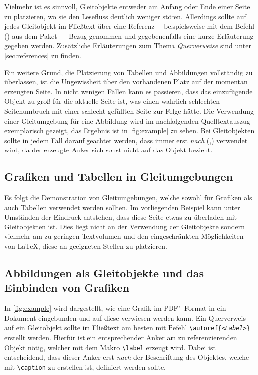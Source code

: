 \documentclass[%
  english,ngerman,%
  cdgeometry=no,DIV=12,%
  automark,%
  listof=toc,%
]{tudscrartcl}
\begin{document}
Vielmehr ist es sinnvoll, Gleitobjekte entweder am Anfang oder Ende einer Seite 
zu platzieren, wo sie den Lesefluss deutlich weniger stören. Allerdings sollte 
auf jedes Gleitobjekt im Fließtext über eine Referenz~-- beispielsweise mit dem 
Befehl () aus dem Paket ~-- 
Bezug genommen und gegebenenfalls eine kurze Erläuterung gegeben werden. 
Zusätzliche Erläuterungen zum Thema \emph{Querverweise} sind unter 
\autoref{sec:references} zu finden.

Ein weitere Grund,  die Platzierung von Tabellen und Abbildungen 
vollständig zu überlassen, ist die Ungewissheit über den vorhandenen Platz auf 
der momentan erzeugten Seite. In nicht wenigen Fällen kann es passieren, dass 
das einzufügende Objekt zu groß für die aktuelle Seite ist, was einen wahrlich 
schlechten Seitenumbruch mit einer schlecht gefüllten Seite zur Folge hätte.
Die Verwendung einer Gleitumgebung für eine Abbildung wird im nachfolgenden 
Quelltextauszug exemplarisch gezeigt, das Ergebnis ist in \autoref{fig:example} 
zu sehen. Bei Gleitobjekten sollte in jedem Fall darauf geachtet werden, dass 
 immer erst \emph{nach} 
(,) verwendet wird, da 
der erzeugte Anker sich sonst nicht auf das Objekt bezieht.
%
\begin{Trunk+}
\section{Grafiken und Tabellen in Gleitumgebungen}
Es folgt die Demonstration von Gleitumgebungen, welche sowohl für 
Grafiken als auch Tabellen verwendet werden sollten. Im vorliegenden 
Beispiel kann unter Umständen der Eindruck entstehen, dass diese Seite 
etwas zu überladen mit Gleitobjekten ist. Dies liegt nicht an der 
Verwendung der Gleitobjekte sondern vielmehr am zu geringen Textvolumen 
und den eingeschränkten Möglichkeiten von \LaTeX{}, diese an geeigneten 
Stellen zu platzieren. 


\subsection{Abbildungen als Gleitobjekte und das Einbinden von Grafiken}
In \autoref{fig:example} wird dargestellt, wie eine Grafik im PDF"~Format 
in ein Dokument eingebunden und auf diese verwiesen werden kann. Ein 
Querverweis auf ein Gleitobjekt sollte im Fließtext am besten mit Befehl 
\texttt{\textbackslash autoref\{\emph{<Label>}\}} erstellt werden. 
Hierfür ist ein entsprechender Anker am zu referenzierenden Objekt nötig, 
welcher mit dem Makro \texttt{\textbackslash label} erzeugt wird. Dabei 
ist entscheidend, dass dieser Anker erst \emph{nach} der Beschriftung des 
Objektes, welche mit \texttt{\textbackslash caption} zu erstellen ist, 
definiert werden sollte.

\end{Trunk+}
\end{document}
